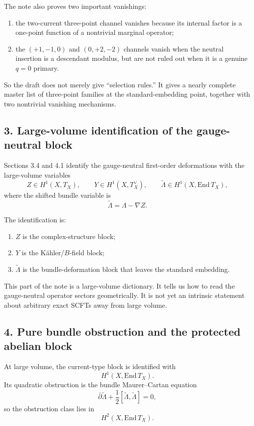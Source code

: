 \documentclass[11pt]{article}
\newcommand{\wt}[1]{\widetilde{#1}}
\begin{document}
The note also proves two important vanishings:
\begin{enumerate}
\item the two-current three-point channel vanishes because its internal factor is a one-point function of a nontrivial marginal operator;
\item the $(+1,-1,0)$ and $(0,+2,-2)$ channels vanish when the neutral insertion is a descendant modulus, but are not ruled out when it is a genuine $q=0$ primary.
\end{enumerate}

So the draft does not merely give ``selection rules.'' It gives a nearly complete master list of three-point families at the standard-embedding point, together with two nontrivial vanishing mechanisms.

\subsection*{3. Large-volume identification of the gauge-neutral block}

Sections 3.4 and 4.1 identify the gauge-neutral first-order deformations with the large-volume variables
\[
Z\in H^1(X,T_X),\qquad
Y\in H^1(X,T_X^\vee),\qquad
\wt\Lambda\in H^1(X,\mathrm{End}\,T_X),
\]
where the shifted bundle variable is
\[
\wt\Lambda=\Lambda-\nabla Z.
\]

The identification is:
\begin{enumerate}
\item $Z$ is the complex-structure block;
\item $Y$ is the K\"ahler/$B$-field block;
\item $\wt\Lambda$ is the bundle-deformation block that leaves the standard embedding.
\end{enumerate}

This part of the note is a large-volume dictionary. It tells us how to read the gauge-neutral operator sectors geometrically. It is not yet an intrinsic statement about arbitrary exact SCFTs away from large volume.

\subsection*{4. Pure bundle obstruction and the protected abelian block}

At large volume, the current-type block is identified with
\[
H^1(X,\mathrm{End}\,T_X).
\]
Its quadratic obstruction is the bundle Maurer--Cartan equation
\[
\bar\partial\wt\Lambda+\frac12[\wt\Lambda,\wt\Lambda]=0,
\]
so the obstruction class lies in
\[
H^2(X,\mathrm{End}\,T_X).
\]
\end{document}
